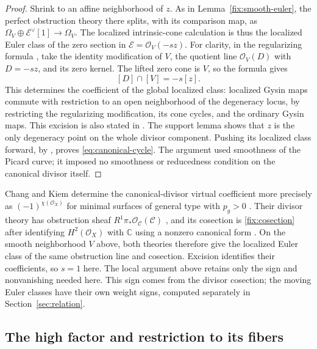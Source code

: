 \begin{proof}
Shrink to an affine neighborhood of \(z\).
As in Lemma~\ref{fix:smooth-euler}, the perfect
obstruction theory there splits, with its comparison map, as
\(\Omega_V\oplus\mathcal E^\vee[1]\to\Omega_V\).
The localized intrinsic-cone calculation is thus the
localized Euler class of the zero section in
\(\mathcal E=\mathcal O_V(-sz)\).
For clarity, in the regularizing formula
\cite[Definition~2.3 and equation~(2.1)]{KiemLi},
take the identity modification of \(V\), the quotient line
\(\mathcal O_V(D)\) with \(D=-sz\), and its zero kernel.
The lifted zero cone is \(V\), so the formula gives
\[
 [D]\cap[V]=-s[z].
\]
This determines the coefficient of the global localized class:
localized Gysin maps commute with restriction to an open
neighborhood of the degeneracy locus, by restricting the
regularizing modification, its cone cycles, and the ordinary
Gysin maps. This excision is also stated in
\cite[Proposition~2.3]{ChangKiem}.
The support lemma shows that \(z\) is the only degeneracy
point on the whole divisor component. Pushing its localized
class forward, by \cite[Theorem~1.1]{KiemLi}, proves
\eqref{eq:canonical-cycle}.
The argument used smoothness of the Picard curve; it imposed no
smoothness or reducedness condition on the canonical divisor itself.
\end{proof}

Chang and Kiem determine the canonical-divisor virtual coefficient more
precisely as $(-1)^{\chi(\mathcal O_X)}$ for minimal surfaces of general
type with $p_g>0$ \cite[Theorem~1.3 and Corollary~3.4]{ChangKiem}.
Their divisor theory has obstruction sheaf
\(R^1\pi_*\mathcal O_{\mathcal C}(\mathcal C)\)
\cite[Theorem~3.1]{ChangKiem}, and its cosection is
\eqref{fix:cosection} after identifying \(H^2(\mathcal O_X)\) with
\(\mathbb C\) using a nonzero canonical form
\cite[Section~3.2]{ChangKiem}.
On the smooth neighborhood \(V\) above, both theories therefore give
the localized Euler class of the same obstruction line and cosection.
Excision identifies their coefficients, so \(s=1\) here.
The local argument above retains only the sign and nonvanishing needed
here.  This sign comes from the divisor cosection; the moving Euler
classes have their own weight signs, computed separately in
Section~\ref{sec:relation}.

\subsection{The high factor and restriction to its fibers}

